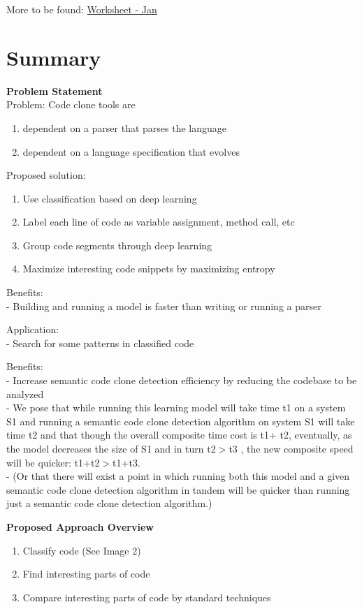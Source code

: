 \documentclass{article}
\begin{document}
    More to be found: \href{https://github.com/johnsimmons2/heuristic-dl/wiki/Worksheet:-Jan}{Worksheet - Jan}



    \section{Summary}
    \textbf{Problem Statement}\\
    Problem: Code clone tools are
    \begin{enumerate}
        \item dependent on a parser that parses the language
        \item dependent on a language specification that evolves
    \end{enumerate}
    Proposed solution:
    \begin{enumerate}
        \item Use classification based on deep learning
        \item Label each line of code as variable assignment, method call, etc
        \item Group code segments through deep learning
        \item Maximize interesting code snippets by maximizing entropy
    \end{enumerate}
    Benefits:\\
    - Building and running a model is faster than writing or running a parser

    Application:\\
    - Search for some patterns in classified code

    Benefits:\\
    - Increase semantic code clone detection efficiency by reducing the codebase to be analyzed \\
    - We pose that while running this learning model will take time t1 on a system S1 and running a semantic code clone detection algorithm on system S1 will take time t2 and that though the overall composite time cost is t1+ t2, eventually, as the model decreases the size of S1 and in turn t2$>$t3 , the new composite speed will be quicker: t1+t2$>$t1+t3.\\
    - (Or that there will exist a point in which running both this model and a given semantic code clone detection algorithm in tandem will be quicker than running just a semantic code clone detection algorithm.)

    \textbf{Proposed Approach Overview}
    \begin{enumerate}
        \item Classify code (See Image 2)
        \item Find interesting parts of code
        \item Compare interesting parts of code by standard techniques
    \end{enumerate}
\end{document}
